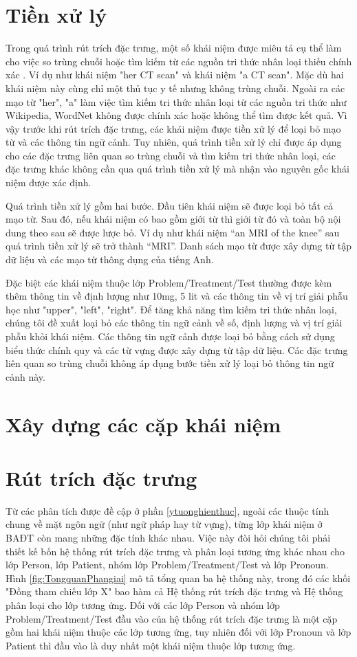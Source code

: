 \section{Tiền xử lý}
Trong quá trình rút trích đặc trưng, một số khái niệm được miêu tả cụ thể làm cho việc so trùng chuỗi hoặc tìm kiếm từ các nguồn tri thức nhân loại thiếu chính xác \cite{YanXu2012}. Ví dụ như khái niệm "her CT scan" và khái niệm "a CT scan". Mặc dù hai khái niệm này cùng chỉ một thủ tục y tế nhưng không trùng chuỗi. Ngoài ra các mạo từ "her", "a" làm việc tìm kiếm tri thức nhân loại từ các nguồn tri thức như Wikipedia, WordNet không được chính xác hoặc không thể tìm được kết quả. Vì vậy trước khi rút trích đặc trưng, các khái niệm được tiền xử lý để loại bỏ mạo từ và các thông tin ngữ cảnh. Tuy nhiên, quá trình tiền xử lý chỉ được áp dụng cho các đặc trưng liên quan so trùng chuỗi và tìm kiếm tri thức nhân loại, các đặc trưng khác không cần qua quá trình tiền xử lý mà nhận vào nguyên gốc khái niệm được xác định.

Quá trình tiền xử lý gồm hai bước. Đầu tiên khái niệm sẽ được loại bỏ tất cả mạo từ. Sau đó, nếu khái niệm có bao gồm giới từ thì giới từ đó và toàn bộ nội dung theo sau sẽ được lược bỏ. Ví dụ như khái niệm “an MRI of the knee” sau quá trình tiền xử lý sẽ trở thành “MRI”. Danh sách mạo từ được xây dựng từ tập dữ liệu và các mạo từ thông dụng của tiếng Anh.

Đặc biệt các khái niệm thuộc lớp Problem/Treatment/Test thường được kèm thêm thông tin về định lượng như 10mg, 5 lit và các thông tin về vị trí giải phẫu học như "upper", "left", "right". Để tăng khả năng tìm kiếm tri thức nhân loại, chúng tôi đề xuất loại bỏ các thông tin ngữ cảnh về số, định lượng và vị trí giải phẫu khỏi khái niệm. Các thông tin ngữ cảnh được loại bỏ bằng cách sử dụng biểu thức chính quy và các từ vựng được xây dựng từ tập dữ liệu. Các đặc trưng liên quan so trùng chuỗi không áp dụng bước tiền xử lý loại bỏ thông tin ngữ cảnh này.
\section{Xây dựng các cặp khái niệm}
\section{Rút trích đặc trưng}
Từ các phân tích được đề cập ở phần \ref{ytuonghienthuc}, ngoài các thuộc tính chung về mặt ngôn ngữ (như ngữ pháp hay từ vựng), từng lớp khái niệm ở BAĐT còn mang những đặc tính khác nhau. Việc này đòi hỏi chúng tôi phải thiết kế bốn hệ thống rút trích đặc trưng và phân loại tương ứng khác nhau cho lớp Person, lớp Patient, nhóm lớp Problem/Treatment/Test và lớp Pronoun. Hình \ref{fig:TongquanPhangiai} mô tả tổng quan ba hệ thống này, trong đó các khối "Đồng tham chiếu lớp X" bao hàm cả Hệ thống rút trích đặc trưng và Hệ thống phân loại cho lớp tương ứng. Đối với các lớp Person và nhóm lớp Problem/Treatment/Test đầu vào của hệ thống rút trích đặc trưng là một cặp gồm hai khái niệm thuộc các lớp tương ứng, tuy nhiên đối với lớp Pronoun và lớp Patient thì đầu vào là duy nhất một khái niệm thuộc lớp tương ứng.

